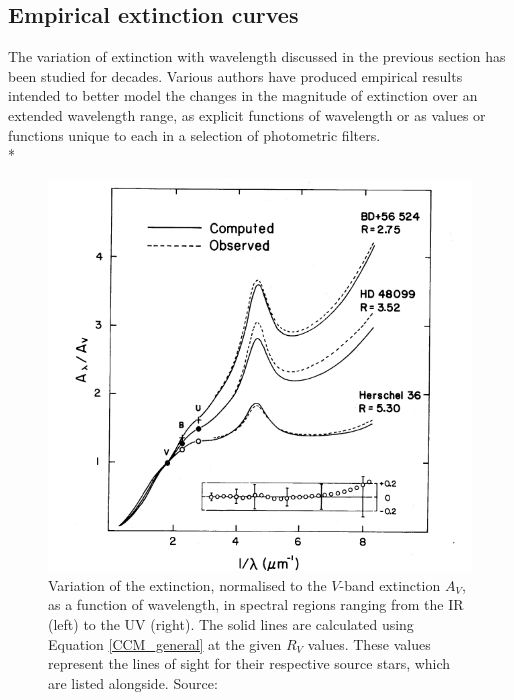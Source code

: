 \documentclass[12pt, a4paper]{report}
\begin{document}
\subsection{Empirical extinction curves} \label{empirical}

The variation of extinction with wavelength discussed in the previous section has been studied for decades. Various authors have produced empirical results intended to better model the changes in the magnitude of extinction over an extended wavelength range, as explicit functions of wavelength or as values or functions unique to each in a selection of photometric filters.\\*

\begin{figure}[h!]
\begin{center}
\includegraphics[width=1.0\textwidth]{cardelli_curve_fig4_crop.png}
\caption{Variation of the extinction, normalised to the $V$-band extinction $A_{V}$, as a function of wavelength, in spectral regions ranging from the IR (left) to the UV (right). The solid lines are calculated using Equation \ref{CCM_general} at the given $R_{V}$ values. These values represent the lines of sight for their respective source stars, which are listed alongside.  Source: \cite{1989ApJ...345..245C}}
\label{cardelli_curve}
\end{center}
\end{figure}
\end{document}
